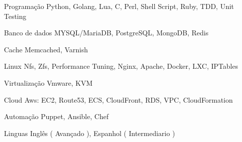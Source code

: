 

\begin{cvskills}

  \cvskill
    {Programação} %
    {Python, Golang, Lua, C, Perl, Shell Script, Ruby, TDD, Unit Testing} %

  \cvskill
    {Banco de dados} %
    {MYSQL/MariaDB, PostgreSQL, MongoDB, Redis} %

  \cvskill
    {Cache} %
    {Memcached, Varnish} %

\cvskill
    {Linux} %
    {Nfs, Zfs, Performance Tuning, Nginx, Apache, Docker, LXC, IPTables } %

\cvskill
    {Virtualização} %
    {Vmware, KVM} %

\cvskill
  {Cloud} %
  {Aws: EC2, Route53, ECS, CloudFront, RDS, VPC, CloudFormation} %

\cvskill
  {Automação} %
  {Puppet, Ansible, Chef} %

\cvskill
  {Linguas} %
  {Inglês ( Avançado ), Espanhol ( Intermediario )} %

\end{cvskills}
